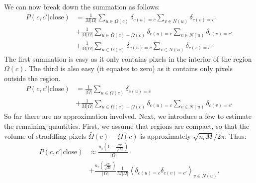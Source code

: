 We can now break down the summation as follows:
\begin{align*}
P(c,c'|\text{close})
&=
\frac{1}{M|\Omega|}
\sum_{u \in \underbar{\Omega}(c)}
\delta_{c(u)=c}
\sum_{v\in N(u)}
\delta_{c(v)=c'}
\\
&+
\frac{1}{M|\Omega|}
\sum_{u \in \bar{\Omega}(c) - \underbar{\Omega}(c)}
\delta_{c(u)=c}
\sum_{v\in N(u)}
\delta_{c(v)=c'}
\\
&+
\frac{1}{M|\Omega|}
\sum_{u \in \bar{\Omega}(c)}
\delta_{c(u)=c}
\sum_{v\in N(u)}
\delta_{c(v)=c'}
\end{align*}
The first summation is easy as it only contains pixels in the interior of the region $\Omega(c)$. The third is also easy (it equates to zero) as it contains only pixels outside the region.
\begin{align*}
P(c,c'|\text{close})
&=
\frac{1}{|\Omega|}
\sum_{u \in \underbar{\Omega}(c)}
\delta_{c(u)=c}
\\
&+
\frac{1}{M|\Omega|}
\sum_{u \in \bar{\Omega}(c) - \underbar{\Omega}(c)}
\delta_{c(u)=c}
\sum_{v\in N(u)}
\delta_{c(v)=c'}
\end{align*}
So far there are no approximation involved. Next, we introduce a few to estimate the remaining quantities. First, we assume that regions are compact, so that the volume of straddling pixels $\bar{\Omega}(c) - \underbar{\Omega}(c)$ is approximately $\sqrt{n_cM}/{2\pi}$. Thus:
\begin{align*}
P(c,c'|\text{close})
&\approx
\frac{n_c\left(1 - \frac{2\pi}{\sqrt{M}}\right)}{|\Omega|}
\\
&+
\frac{n_c\left(\frac{2\pi}{\sqrt{M}}\right)}{|\Omega|}
\frac{1}{M|\Omega|}
\left\langle
\delta_{c(u)=c}
\delta_{c(v)=c'}
\right\rangle_{v \in N(u)}.
\end{align*}

